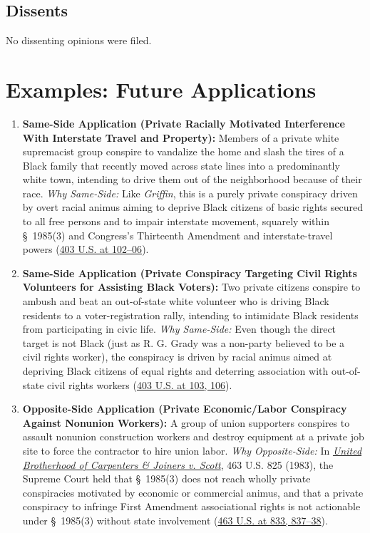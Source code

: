 \documentclass[12pt]{article}
\begin{document}
\subsection{Dissents}

No dissenting opinions were filed.

\section{Examples: Future Applications}

\begin{enumerate}
\item \textbf{Same-Side Application (Private Racially Motivated Interference With Interstate Travel and Property):} Members of a private white supremacist group conspire to vandalize the home and slash the tires of a Black family that recently moved across state lines into a predominantly white town, intending to drive them out of the neighborhood because of their race. \textit{Why Same-Side:} Like \textit{Griffin}, this is a purely private conspiracy driven by overt racial animus aiming to deprive Black citizens of basic rights secured to all free persons and to impair interstate movement, squarely within \S~1985(3) and Congress's Thirteenth Amendment and interstate-travel powers (\href{https://supreme.justia.com/cases/federal/us/403/88/}{403 U.S. at 102--06}).

\item \textbf{Same-Side Application (Private Conspiracy Targeting Civil Rights Volunteers for Assisting Black Voters):} Two private citizens conspire to ambush and beat an out-of-state white volunteer who is driving Black residents to a voter-registration rally, intending to intimidate Black residents from participating in civic life. \textit{Why Same-Side:} Even though the direct target is not Black (just as R. G. Grady was a non-party believed to be a civil rights worker), the conspiracy is driven by racial animus aimed at depriving Black citizens of equal rights and deterring association with out-of-state civil rights workers (\href{https://supreme.justia.com/cases/federal/us/403/88/}{403 U.S. at 103, 106}).

\item \textbf{Opposite-Side Application (Private Economic/Labor Conspiracy Against Nonunion Workers):} A group of union supporters conspires to assault nonunion construction workers and destroy equipment at a private job site to force the contractor to hire union labor. \textit{Why Opposite-Side:} In \href{https://caselaw.findlaw.com/court/us-supreme-court/463/825.html}{\textit{United Brotherhood of Carpenters \& Joiners v. Scott}}, 463 U.S. 825 (1983), the Supreme Court held that \S~1985(3) does not reach wholly private conspiracies motivated by economic or commercial animus, and that a private conspiracy to infringe First Amendment associational rights is not actionable under \S~1985(3) without state involvement (\href{https://caselaw.findlaw.com/court/us-supreme-court/463/825.html}{463 U.S. at 833, 837--38}).


\end{enumerate}
\end{document}
